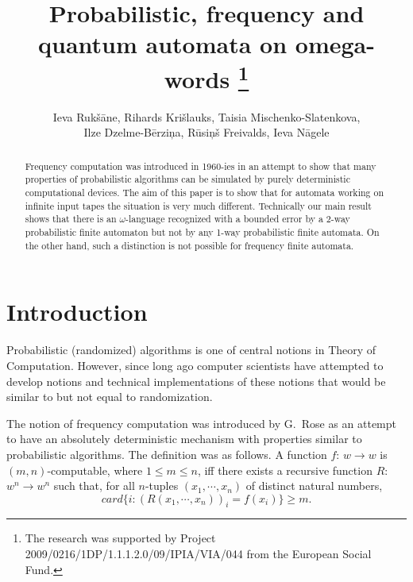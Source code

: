 \documentclass{llncs}
\begin{document}
\title{Probabilistic, frequency and quantum  automata on omega-words
\thanks{%
The research was supported by  Project 2009/0216/1DP/1.1.1.2.0/09/IPIA/VIA/044
from the 
European Social Fund.
} 
}

\author{
Ieva Ruk\v s\= ane,
Rihards Kri\v slauks,
Taisia Mischenko-Slatenkova,\\
Ilze Dzelme-B\= erzi\c na,
R\= usi\c n\v s Freivalds,
Ieva N\= agele}

\maketitle

\begin{abstract}  Frequency computation was introduced in 1960-ies in an attempt to show that many properties of probabilistic algorithms can be simulated by purely deterministic computational devices. The aim of this paper is to show that for automata working on infinite input tapes the situation is very much different. Technically our main result shows that there is an $\omega$-language recognized with a bounded error by a 2-way probabilistic finite automaton but not by any 1-way probabilistic finite automata. On the other hand, such a distinction is not possible for frequency finite automata.

\end{abstract} 

\section{Introduction}


Probabilistic (randomized) algorithms is one of central notions in Theory of Computation. However, since long ago computer scientists have attempted to develop notions and technical implementations of these notions that would be similar to but not equal to randomization.
 

The notion of frequency computation was introduced by G.~Rose \cite{R60} as an attempt to have an absolutely deterministic mechanism with properties similar to probabilistic algorithms. The definition was as follows. A function $f$: $w \to w$ is $(m,n)$-computable, where $1 \leq m \leq n$, iff there exists a recursive function $R$: $w^n \to w^n$ such that, for all $n$-tuples $(x_1, \cdots , x_n)$ of distinct natural numbers,
$$
card\{i: (R(x_1,\cdots , x_n))_i = f(x_i)\} \geq m.
$$
\end{document}
